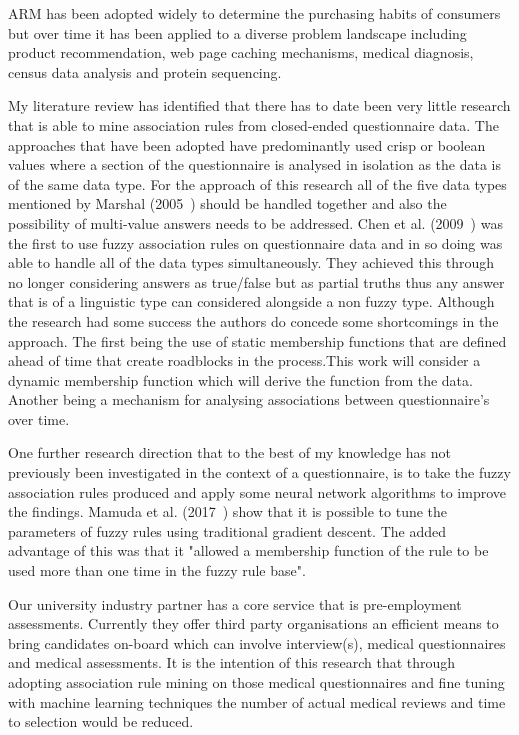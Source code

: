ARM has been adopted widely to determine the purchasing habits of consumers but over time it has been applied to a diverse problem landscape including product recommendation, web page caching mechanisms, medical diagnosis, census data analysis and protein sequencing.

My literature review has identified that there has to date been very little research that is able to mine association rules from closed-ended questionnaire data. The approaches that have been adopted have predominantly used crisp or boolean values where a section of the questionnaire is analysed in isolation as the data is of the same data type. For the approach of this research all of the five data types mentioned by Marshal (2005~\cite{marshall2005purpose}) should be handled together and also the possibility of multi-value answers needs to be addressed. Chen et al. (2009~\cite{chen2009mining}) was the first to use fuzzy association rules on questionnaire data and in so doing was able to handle all of the data types simultaneously. They achieved this through no longer considering answers as true/false but as partial truths thus any answer that is of a linguistic type can considered alongside a non fuzzy type. Although the research had some success the authors do concede some shortcomings in the approach. The first being the use of static membership functions that are defined ahead of time that create roadblocks in the process.This work will consider a dynamic membership function which will derive the function from the data. Another being a mechanism for analysing associations between questionnaire's over time.

One further research direction that to the best of my knowledge has not previously been investigated in the context of a questionnaire, is to take the fuzzy association rules produced and apply some neural network algorithms to improve the findings. Mamuda et al. (2017~\cite{mamuda2017fusion}) show that it is possible to tune the parameters of fuzzy rules using traditional gradient descent. The added advantage of this was that it "allowed a membership function of the rule to be used more than one time in the fuzzy rule base".


Our university industry partner has a core service that is pre-employment assessments. Currently they offer third party organisations an efficient means to bring candidates on-board which can involve interview(s), medical questionnaires and medical assessments. It is the intention of this research that through adopting association rule mining on those medical questionnaires and fine tuning with machine learning techniques the number of actual medical reviews and time to selection would be reduced.

